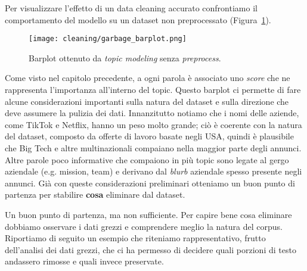 Per visualizzare l'effetto di un data cleaning accurato confrontiamo il comportamento del modello su un dataset non preprocessato (Figura~\ref{fig:garbage-barplot}).

\begin{figure}[H]
    \centering
    \texttt{[image: cleaning/garbage\_barplot.png]}
    \caption{Barplot ottenuto da \textit{topic modeling} senza \textit{preprocess}.}
    \label{fig:garbage-barplot}
\end{figure}

Come visto nel capitolo precedente, a ogni parola è associato uno \textit{score} che ne rappresenta l'importanza all'interno del topic. Questo barplot ci permette di fare alcune considerazioni importanti sulla natura del dataset e sulla direzione che deve assumere la pulizia dei dati. Innanzitutto notiamo che i nomi delle aziende, come TikTok e Netflix, hanno un peso molto grande; ciò è coerente con la natura del dataset, composto da offerte di lavoro basate negli USA, quindi è plausibile che Big Tech e altre multinazionali compaiano nella maggior parte degli annunci. Altre parole poco informative che compaiono in più topic sono legate al gergo aziendale (e.g. mission, team) e derivano dal \textit{blurb} aziendale spesso presente negli annunci. Già con queste considerazioni preliminari otteniamo un buon punto di partenza per stabilire \textbf{cosa} eliminare dal dataset.

Un buon punto di partenza, ma non sufficiente. Per capire bene cosa eliminare dobbiamo osservare i dati grezzi e comprendere meglio la natura del corpus. Riportiamo di seguito un esempio che riteniamo rappresentativo, frutto dell'analisi dei dati grezzi, che ci ha permesso di decidere quali porzioni di testo andassero rimosse e quali invece preservate.

